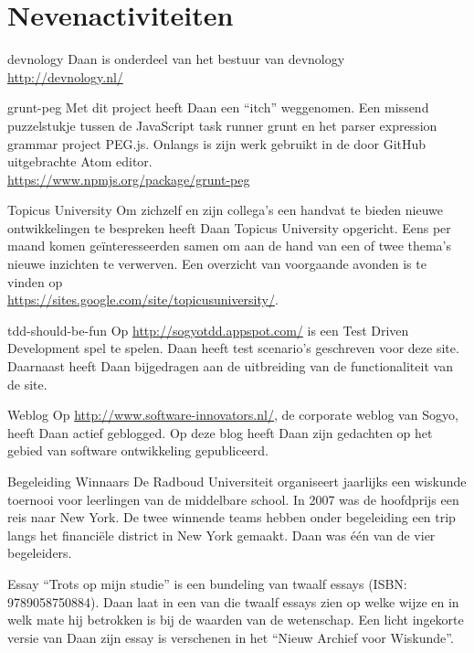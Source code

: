 \section*{Nevenactiviteiten}

	\begin{subActivityList}
		\item[devnology] Daan is onderdeel van het bestuur van devnology\\
		\url{http://devnology.nl/}\hfill\\

		\item[grunt-peg] Met dit project heeft Daan een
		``itch'' weggenomen. Een missend puzzelstukje tussen
		de JavaScript task runner grunt en het parser
		expression grammar project PEG.js.
		Onlangs is zijn werk gebruikt in de door GitHub
		uitgebrachte Atom editor.\\
		\url{https://www.npmjs.org/package/grunt-peg}\hfill\\

		\item[Topicus University] Om zichzelf en zijn collega's een handvat te
		bieden nieuwe ontwikkelingen te bespreken heeft Daan Topicus University
		opgericht. Eens per maand komen ge\"interesseerden samen om aan de hand
		van een of twee thema's nieuwe inzichten te verwerven. Een overzicht
		van voorgaande avonden is te vinden op\\
		\url{https://sites.google.com/site/topicusuniversity/}.\hfill\\

		\item[tdd-should-be-fun] Op \url{http://sogyotdd.appspot.com/} is een
		Test Driven Development spel te spelen. Daan heeft test scenario's
		geschreven voor deze site. Daarnaast heeft Daan bijgedragen aan de
		uitbreiding van de functionaliteit van de site.\hfill\\

		\item[Weblog] Op \url{http://www.software-innovators.nl/}, de corporate
		weblog van Sogyo, heeft Daan actief geblogged. Op deze blog heeft
		Daan zijn gedachten op het gebied van software ontwikkeling gepubliceerd.
		\hfill\\

		\item[Begeleiding Winnaars] De Radboud Universiteit organiseert
		jaarlijks een wiskunde toernooi voor leerlingen van de middelbare
		school. In 2007 was de hoofdprijs een reis naar New York. De twee
		winnende teams hebben onder begeleiding een trip langs het financi\"ele
		district in New York gemaakt. Daan was \'e\'en van de vier begeleiders.
		\hfill\\

		\item[Essay] ``Trots op mijn studie'' is een bundeling van twaalf essays
		(ISBN: 9789058750884). Daan laat in een van die twaalf essays zien op
		welke wijze en in welk mate hij betrokken is bij de waarden van de
		wetenschap.
		Een licht ingekorte versie van Daan zijn essay is verschenen in het
		``Nieuw Archief voor Wiskunde''.
		\hfill\\
	\end{subActivityList}
